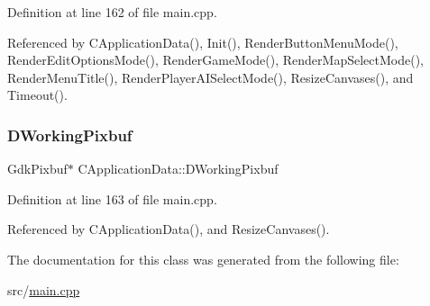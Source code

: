 Definition at line 162 of file main.\+cpp.



Referenced by C\+Application\+Data(), Init(), Render\+Button\+Menu\+Mode(), Render\+Edit\+Options\+Mode(), Render\+Game\+Mode(), Render\+Map\+Select\+Mode(), Render\+Menu\+Title(), Render\+Player\+A\+I\+Select\+Mode(), Resize\+Canvases(), and Timeout().

\hypertarget{classCApplicationData_a19355c8cf25f216019db728219185119}{}\label{classCApplicationData_a19355c8cf25f216019db728219185119} 
\subsubsection{\texorpdfstring{D\+Working\+Pixbuf}{DWorkingPixbuf}}
{\footnotesize\ttfamily Gdk\+Pixbuf$\ast$ C\+Application\+Data\+::\+D\+Working\+Pixbuf\hspace{0.3cm}{\ttfamily [protected]}}



Definition at line 163 of file main.\+cpp.



Referenced by C\+Application\+Data(), and Resize\+Canvases().



The documentation for this class was generated from the following file\+:\begin{DoxyCompactItemize}
\item 
src/\hyperlink{main_8cpp}{main.\+cpp}\end{DoxyCompactItemize}
